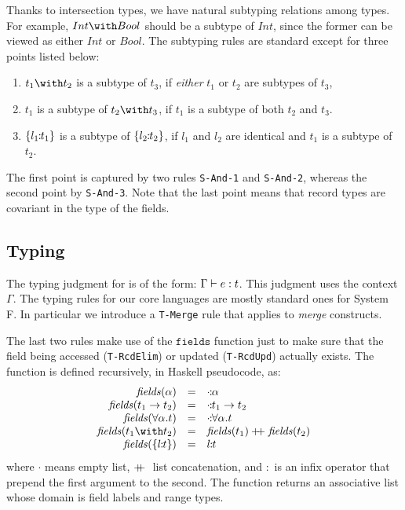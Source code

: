 Thanks to intersection types, we have natural subtyping relations among types.
For example, $ Int \with Bool $ should be a subtype of $ Int $, since the former
can be viewed as either $ Int $ or $ Bool $. The subtyping rules are standard
except for three points listed below:
\begin{enumerate}
\item $ t_1 \with t_2 $ is a subtype of $ t_3 $, if \emph{either} $ t_1 $ or
  $ t_2 $ are subtypes of $ t_3 $,

\item $ t_1 $ is a subtype of $ t_2 \with t_3 $, if $ t_1 $ is a subtype of
  both $ t_2 $ and $ t_3 $.

\item $ \{ l_1 \!\!:\!\! t_1 \} $ is a subtype of $ \{ l_2 \!\!:\!\! t_2 \} $, if
  $ l_1 $ and $ l_2 $ are identical and $ t_1 $ is a subtype of $ t_2 $.
\end{enumerate}
The first point is captured by two rules \texttt{S-And-1} and \texttt{S-And-2},
whereas the second point by \texttt{S-And-3}. Note that the last point means
that record types are covariant in the type of the fields.

\subsection{Typing}

The typing judgment for \name is of the form: $ \Gamma \vdash e : t $. This
judgment uses the context $ \Gamma $. The typing rules for our core languages
are mostly standard ones for System F. In particular we introduce a
\texttt{T-Merge} rule that applies to \emph{merge} constructs.

The last two rules make use of the $ \texttt{fields} $ function just to make
sure that the field being accessed (\texttt{T-RcdElim}) or updated
(\texttt{T-RcdUpd}) actually exists. The function is defined recursively, in
Haskell pseudocode, as:
\[ \begin{array}{rll}
  \fields{\alpha} & = & \rel{\cdot}{\alpha} \\
  \fields{t_1 \to t_2} & = & \rel{\cdot}{t_1 \to t_2} \\
  \fields{\univquant{\alpha}{t}} & = & \rel{\cdot}{\univquant{\alpha}{t}} \\
  \fields{t_1 \with t_2} & = & \fields{t_1} \dplus \fields{t_2} \\
  \fields{\recordtype{l}{t}} & = & \rel{l}{t}
\end{array} \]
where $ \cdot $ means empty list, $ +\!\!\!+ \; $ list concatenation, and $ : $ is an
infix operator that prepend the first argument to the second. The function
returns an associative list whose domain is field labels and range types.

